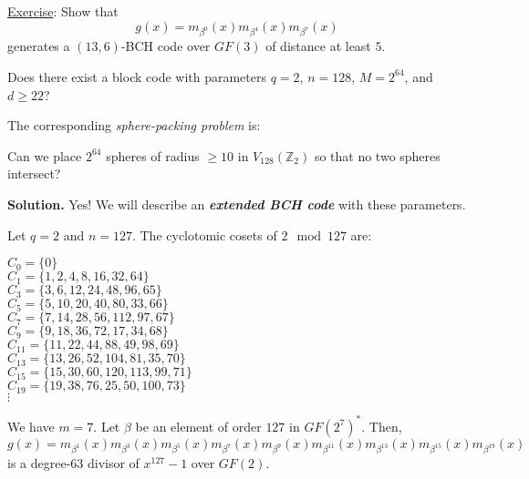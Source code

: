 \underline{Exercise}: Show that
\[ g(x)=m_{\beta^0}(x)m_{\beta^4}(x)m_{\beta^7}(x) \]
generates a $ (13,6) $-BCH code over $ GF(3) $ of distance at least $ 5 $.

\begin{exbox}
    \begin{example}
        Does there exist a block code with parameters
        $ q=2 $, $ n=128 $, $ M=2^{64} $, and $ d\geqslant 22 $?

        The corresponding \emph{sphere-packing problem} is:

        Can we place $ 2^{64} $ spheres of radius
        $ \geqslant 10 $ in $ V_{128}(\mathbb{Z}_2) $
        so that no two spheres intersect?

        \textbf{Solution.} Yes! We will describe an
        \textbf{\emph{extended BCH code}} with these parameters.

        Let $ q=2 $ and $ n=127 $. The cyclotomic cosets
        of $ 2\mod 127 $ are:

        \begin{center}
            \begin{multicols}{2}
                $ C_0=\{0\} $\\
                $ C_1=\{1,2,4,8,16,32,64\} $\\
                $ C_3=\{3,6,12,24,48,96,65\} $\\
                $ C_5=\{5,10,20,40,80,33,66\} $\\
                $ C_7=\{7,14,28,56,112,97,67\} $\\
                $ C_9=\{9,18,36,72,17,34,68\} $\\
                $ C_{11}=\{11,22,44,88,49,98,69\} $\\
                $ C_{13}=\{13,26,52,104,81,35,70\} $\\
                $ C_{15}=\{15,30,60,120,113,99,71\} $\\
                $ C_{19}=\{19,38,76,25,50,100,73\} $\\
                $ \vdots $
            \end{multicols}
        \end{center}

        We have $ m=7 $. Let $ \beta $ be an element of order $ 127 $
        in $ GF(2^7)^* $. Then,
        \[ g(x)=m_{\beta^1}(x)m_{\beta^3}(x)m_{\beta^5}(x)m_{\beta^7}(x)
            m_{\beta^9}(x)m_{\beta^{11}}(x)m_{\beta^{13}}(x)
            m_{\beta^{15}}(x)m_{\beta^{19}}(x) \]
        is a degree-$ 63 $ divisor of $ x^{127}-1 $ over $ GF(2) $.


\end{example}
\end{exbox}
